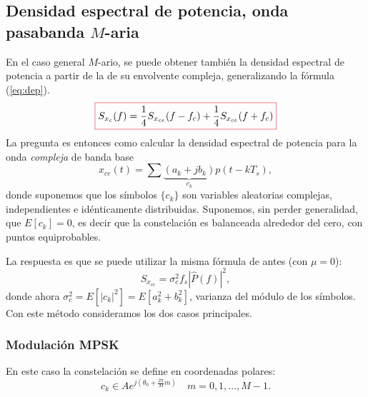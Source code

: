 \begin{figure}[htb]
\begin{minipage}{\textwidth}
        \endpgfgraphicnamed \end{minipage}
\end{figure}

\subsection*{Densidad espectral de potencia, onda pasabanda $M$-aria}

En el caso general $M$-ario, se puede obtener también la densidad espectral de potencia  a partir de
la de su envolvente compleja, generalizando la fórmula (\ref{eq:dep}).
\[
    \col{S_{x_c}(f) = \frac{1}{4}S_{x_{ce}}(f-f_c) +
    \frac{1}{4}S_{x_{ce}}(f+f_c)}
\]
La pregunta es entonces como calcular la densidad espectral de potencia para la onda \emph{compleja} de
banda base
\[x_{ce}(t) = \sum \underbrace{(a_k+j b_k)}_{c_k} p(t-kT_s),\]
donde suponemos que los símbolos $\{c_k\}$ son variables aleatorias complejas, independientes e
idénticamente distribuidas. Suponemos, sin perder generalidad, que $E[c_k]=0$, es decir que la
constelación es balanceada alrededor del cero, con puntos equiprobables.

\newpage

La respuesta es que se puede utilizar la misma fórmula de antes (con $\mu=0$):
\[
    S_{x_{ce}} = \sigma_c^2 f_s |\hat{P}(f)|^2,
        \]
donde ahora $\sigma_c^2 = E[|c_k|^2] = E[a_k^2 + b_k^2]$, varianza del módulo de los símbolos.
Con este método consideramos los dos casos principales.

\subsubsection*{Modulación MPSK}


En este caso la constelación se define en coordenadas polares:
\[
c_k \in A e^{j(\theta_0 + \frac{2\pi}{M}{m})} \quad m=0,1,\ldots,M-1.\]

